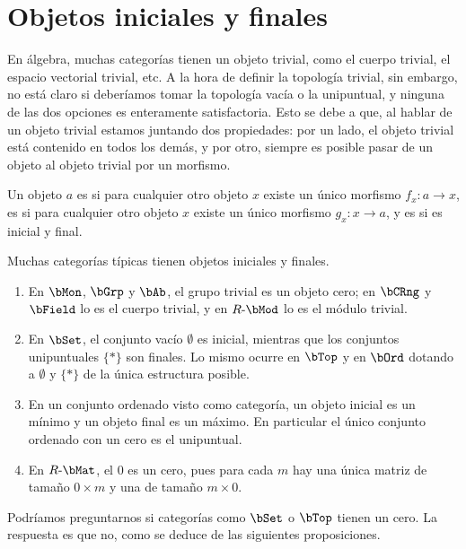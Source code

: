 \section{Objetos iniciales y finales}

En álgebra, muchas categorías tienen un objeto trivial, como el cuerpo trivial,
el espacio vectorial trivial, etc. A la hora de definir la topología trivial,
sin embargo, no está claro si deberíamos tomar la topología vacía o la
unipuntual, y ninguna de las dos opciones es enteramente satisfactoria. Esto se
debe a que, al hablar de un objeto trivial estamos juntando dos propiedades: por
un lado, el objeto trivial está contenido en todos los demás, y por otro,
siempre es posible pasar de un objeto al objeto trivial por un morfismo.

\begin{definition}
  Un objeto $a$ es  si para cualquier otro objeto $x$ existe un
  único morfismo $f_x:a\to x$, es  si para cualquier otro objeto $x$
  existe un único morfismo $g_x:x\to a$, y es  si es inicial y final.
\end{definition}

\begin{example}
  Muchas categorías típicas tienen objetos iniciales y finales.
  \begin{enumerate}
  \item En $\bMon$, $\bGrp$ y $\bAb$, el grupo trivial es un objeto cero; en
    $\bCRng$ y $\bField$ lo es el cuerpo trivial, y en $R\dash\bMod$ lo es el
    módulo trivial.
  \item En $\bSet$, el conjunto vacío $\emptyset$ es inicial, mientras que los
    conjuntos unipuntuales $\{*\}$ son finales. Lo mismo ocurre en $\bTop$ y en
    $\bOrd$ dotando a $\emptyset$ y $\{*\}$ de la única estructura posible.
  \item En un conjunto ordenado visto como categoría, un objeto inicial es un
    mínimo y un objeto final es un máximo. En particular el único conjunto
    ordenado con un cero es el unipuntual.
  \item En $R\dash\bMat$, el 0 es un cero, pues para cada $m$ hay una única
    matriz de tamaño $0\times m$ y una de tamaño $m\times 0$.
  \end{enumerate}
\end{example}

Podríamos preguntarnos si categorías como $\bSet$ o $\bTop$ tienen un cero.
La respuesta es que no, como se deduce de las siguientes proposiciones.

